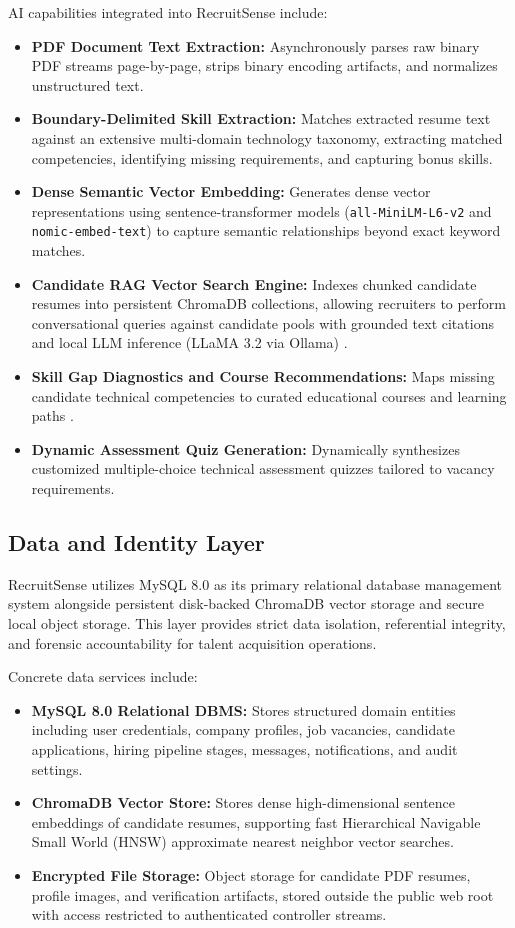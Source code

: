 AI capabilities integrated into RecruitSense include:
\begin{itemize}
    \item \textbf{PDF Document Text Extraction:} Asynchronously parses raw binary PDF streams page-by-page, strips binary encoding artifacts, and normalizes unstructured text.
    \item \textbf{Boundary-Delimited Skill Extraction:} Matches extracted resume text against an extensive multi-domain technology taxonomy, extracting matched competencies, identifying missing requirements, and capturing bonus skills.
    \item \textbf{Dense Semantic Vector Embedding:} Generates dense vector representations using sentence-transformer models (\texttt{all-MiniLM-L6-v2} and \texttt{nomic-embed-text}) to capture semantic relationships beyond exact keyword matches.
    \item \textbf{Candidate RAG Vector Search Engine:} Indexes chunked candidate resumes into persistent ChromaDB collections, allowing recruiters to perform conversational queries against candidate pools with grounded text citations and local LLM inference (LLaMA 3.2 via Ollama) \cite{lewis2020rag}.
    \item \textbf{Skill Gap Diagnostics and Course Recommendations:} Maps missing candidate technical competencies to curated educational courses and learning paths \cite{karimi2020course}.
    \item \textbf{Dynamic Assessment Quiz Generation:} Dynamically synthesizes customized multiple-choice technical assessment quizzes tailored to vacancy requirements.
\end{itemize}

\subsection{Data and Identity Layer}
RecruitSense utilizes MySQL 8.0 as its primary relational database management system alongside persistent disk-backed ChromaDB vector storage and secure local object storage. This layer provides strict data isolation, referential integrity, and forensic accountability for talent acquisition operations.

Concrete data services include:
\begin{itemize}
    \item \textbf{MySQL 8.0 Relational DBMS:} Stores structured domain entities including user credentials, company profiles, job vacancies, candidate applications, hiring pipeline stages, messages, notifications, and audit settings.
    \item \textbf{ChromaDB Vector Store:} Stores dense high-dimensional sentence embeddings of candidate resumes, supporting fast Hierarchical Navigable Small World (HNSW) approximate nearest neighbor vector searches.
    \item \textbf{Encrypted File Storage:} Object storage for candidate PDF resumes, profile images, and verification artifacts, stored outside the public web root with access restricted to authenticated controller streams.
\end{itemize}


